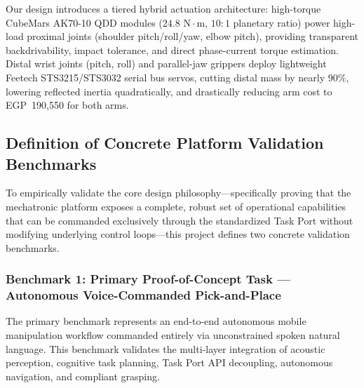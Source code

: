 \begin{enumerate}[leftmargin=1.5em]
  Our design introduces a tiered hybrid actuation architecture: high-torque CubeMars AK70-10 QDD modules ($24.8\text{ N}\cdot\text{m}$, $10:1$ planetary ratio) power high-load proximal joints (shoulder pitch/roll/yaw, elbow pitch), providing transparent backdrivability, impact tolerance, and direct phase-current torque estimation. Distal wrist joints (pitch, roll) and parallel-jaw grippers deploy lightweight Feetech STS3215/STS3032 serial bus servos, cutting distal mass by nearly $90\%$, lowering reflected inertia quadratically, and drastically reducing arm cost to EGP~190,550 for both arms.
\end{enumerate}

\subsection{Definition of Concrete Platform Validation Benchmarks}
To empirically validate the core design philosophy---specifically proving that the mechatronic platform exposes a complete, robust set of operational capabilities that can be commanded exclusively through the standardized Task Port without modifying underlying control loops---this project defines two concrete validation benchmarks.

\subsubsection{Benchmark 1: Primary Proof-of-Concept Task --- Autonomous Voice-Commanded Pick-and-Place}
The primary benchmark represents an end-to-end autonomous mobile manipulation workflow commanded entirely via unconstrained spoken natural language. This benchmark validates the multi-layer integration of acoustic perception, cognitive task planning, Task Port API decoupling, autonomous navigation, and compliant grasping.

